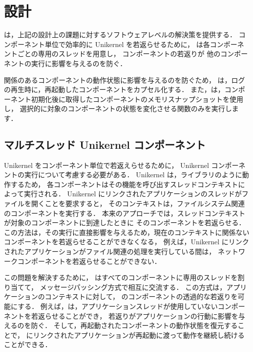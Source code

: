 \section{設計} \label{sec:design}


\sysname は，上記の設計上の課題に対するソフトウェアレベルの解決策を提供する．
コンポーネント単位で効率的に Unikernel を若返らせるために，
\sysname は各コンポーネントごとの専用のスレッドを用意し，
コンポーネントの若返りが
他のコンポーネントの実行に影響を与えるのを防ぐ．

関係のあるコンポーネントの動作状態に影響を与えるのを防ぐため，
\sysname は，ログの再生時に，再起動したコンポーネントをカプセル化する．
また，\sysname は，コンポーネント初期化後に取得したコンポーネントのメモリスナップショットを使用し，
選択的に対象のコンポーネントの状態を変化させる関数のみを実行します．


\subsection{マルチスレッド Unikernel コンポーネント}

Unikernel をコンポーネント単位で若返えらせるために，
Unikernel コンポーネントの実行について考慮する必要がある．
Unikernel は，ライブラリのように動作するため，
各コンポーネントはその機能を呼び出すスレッドコンテキストによって実行される．
Unikernel にリンクされたアプリケーションのスレッドがファイルを開くことを要求すると，
そのコンテキストは，ファイルシステム関連のコンポーネントを実行する．
本来のアプローチでは，スレッドコンテキストが対象のコンポーネントに到達したときに
そのコンポーネントを若返らせる．
この方法は，その実行に直接影響を与えるため，現在のコンテキストに関係ないコンポーネントを若返らせることができなくなる，
例えば，Unikernel にリンクされたアプリケーションがファイル関連の処理を実行している間は，
ネットワークコンポーネントを若返らせることができない．

この問題を解決するために，
\sysname はすべてのコンポーネントに専用のスレッドを割り当てて，
メッセージパッシング方式で相互に交流する．
この方式は，アプリケーションのコンテキストに対して， \sysname のコンポーネントの透過的な若返りを可能にする．
例えば，\sysname は，アプリケーションスレッドが使用していないコンポーネントを若返らせることができ，
若返りがアプリケーションの行動に影響を与えるのを防ぐ．
そして，再起動されたコンポーネントの動作状態を復元することで，
\sysname にリンクされたアプリケーションが再起動に渡って動作を継続し続けることができる．

